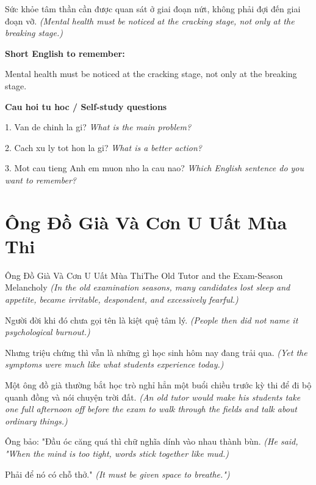 \begin{baihoc}
Sức khỏe tâm thần cần được quan sát ở giai đoạn nứt, không phải đợi đến giai đoạn vỡ.
\textit{(Mental health must be noticed at the cracking stage, not only at the breaking stage.)}
\end{baihoc}

\begin{ghinhoanh}
\textbf{Short English to remember:}

Mental health must be noticed at the cracking stage, not only at the breaking stage.

\end{ghinhoanh}

\begin{tuhocnhanh}
\textbf{Cau hoi tu hoc / Self-study questions}

1. Van de chinh la gi? \textit{What is the main problem?}

2. Cach xu ly tot hon la gi? \textit{What is a better action?}

3. Mot cau tieng Anh em muon nho la cau nao? \textit{Which English sentence do you want to remember?}
\end{tuhocnhanh}
\ngancach

\section{Ông Đồ Già Và Cơn U Uất Mùa Thi}
\begin{truyen}{Ông Đồ Già Và Cơn U Uất Mùa Thi}{The Old Tutor and the Exam-Season Melancholy}
\textit{(In the old examination seasons, many candidates lost sleep and appetite, became irritable, despondent, and excessively fearful.)}

Người đời khi đó chưa gọi tên là kiệt quệ tâm lý.
\textit{(People then did not name it psychological burnout.)}

Nhưng triệu chứng thì vẫn là những gì học sinh hôm nay đang trải qua.
\textit{(Yet the symptoms were much like what students experience today.)}

Một ông đồ già thường bắt học trò nghỉ hẳn một buổi chiều trước kỳ thi để đi bộ quanh đồng và nói chuyện trời đất.
\textit{(An old tutor would make his students take one full afternoon off before the exam to walk through the fields and talk about ordinary things.)}

Ông bảo: "Đầu óc căng quá thì chữ nghĩa dính vào nhau thành bùn.
\textit{(He said, "When the mind is too tight, words stick together like mud.)}

Phải để nó có chỗ thở."
\textit{(It must be given space to breathe.")}

\end{truyen}

